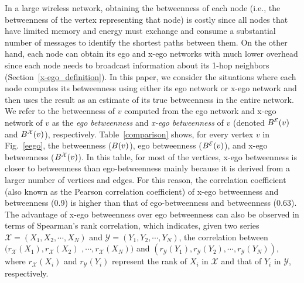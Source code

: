 In a large wireless network, obtaining the betweenness of each node (i.e., the betweenness of the vertex representing that node) is costly since  all nodes that have limited memory and energy must exchange and consume a substantial number of messages to identify the shortest paths between them.
On the other hand, each node can obtain its ego and x-ego networks with much lower overhead since each node  needs to broadcast information about its 1-hop neighbors (Section~\ref{x-ego_definition}). 
In this paper, we consider the situations where each node computes its betweenness using either its ego network or x-ego network and then uses the result as an estimate of its true betweenness in the entire network.
We refer to the betweenness of $v$ computed from the ego network and x-ego network of $v$ as the {\em ego betweenness} and {\em x-ego betweenness} of $v$ (denoted $B^{\mathcal{E}}({v})$ and $B^{\mathcal{X}}({v})$), respectively.
Table~\ref{comparison} shows, for every vertex $v$ in Fig.~\ref{eego}, the betweenness ($B({v})$), ego betweenness ($B^{\mathcal{E}}({v})$), and x-ego betweenness ($B^{\mathcal{X}}({v})$).
In this table, for most of the vertices, x-ego betweenness is closer to betweenness than ego-betweenness mainly because it is derived from a larger number of vertices and edges.
For this reason, the correlation coefficient (also known as the Pearson correlation coefficient) of x-ego betweenness and betweenness (0.9) is higher than that of ego-betweenness and betweenness (0.63).
The advantage of x-ego betweenness over ego betweenness can also be observed in terms of Spearman's rank correlation, which indicates, given two series $\mathcal{X}=(X_1, X_2, \cdots, X_N)$ and $\mathcal{Y}=(Y_1, Y_2, \cdots, Y_N)$, the correlation between $(r_{\mathcal{X}}(X_1), r_{\mathcal{X}}(X_2)$ $, \cdots, r_{\mathcal{X}}(X_N))$ and $(r_{\mathcal{Y}}(Y_1), r_{\mathcal{Y}}(Y_2), \cdots, r_{\mathcal{Y}}(Y_N))$, where $r_{\mathcal{X}}(X_i)$ and $r_{\mathcal{Y}}(Y_i)$ represent the rank of $X_i$ in $\mathcal{X}$ and that of $Y_i$ in $\mathcal{Y}$, respectively.
